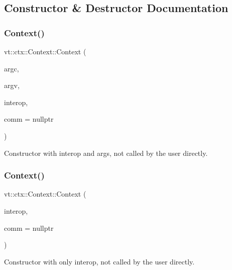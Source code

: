 \subsection{Constructor \& Destructor Documentation}
\mbox{\label{structvt_1_1ctx_1_1_context_a860016b34ca68006a733314f970216b8}} 
\subsubsection{\texorpdfstring{Context()}{Context()}\hspace{0.1cm}{\footnotesize\ttfamily [1/2]}}
{\footnotesize\ttfamily vt\+::ctx\+::\+Context\+::\+Context (\begin{DoxyParamCaption}\item[{int}]{argc,  }\item[{char $\ast$$\ast$}]{argv,  }\item[{bool const}]{interop,  }\item[{M\+P\+I\+\_\+\+Comm $\ast$}]{comm = {\ttfamily nullptr} }\end{DoxyParamCaption})}



Constructor with interop and args, not called by the user directly. 

\mbox{\label{structvt_1_1ctx_1_1_context_a9f5b0fcad61a79f18fdaf7d757b52b6a}} 
\subsubsection{\texorpdfstring{Context()}{Context()}\hspace{0.1cm}{\footnotesize\ttfamily [2/2]}}
{\footnotesize\ttfamily vt\+::ctx\+::\+Context\+::\+Context (\begin{DoxyParamCaption}\item[{bool const}]{interop,  }\item[{M\+P\+I\+\_\+\+Comm $\ast$}]{comm = {\ttfamily nullptr} }\end{DoxyParamCaption})}



Constructor with only interop, not called by the user directly. 



